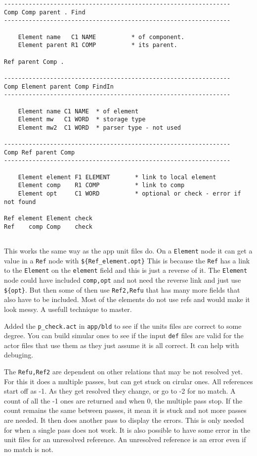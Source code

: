 \begin{verbatim}
----------------------------------------------------------------
Comp Comp parent . Find
----------------------------------------------------------------

    Element name   C1 NAME          * of component.
    Element parent R1 COMP          * its parent.

Ref parent Comp .

----------------------------------------------------------------
Comp Element parent Comp FindIn
----------------------------------------------------------------

    Element name C1 NAME  * of element
    Element mw   C1 WORD  * storage type
    Element mw2  C1 WORD  * parser type - not used
    
----------------------------------------------------------------
Comp Ref parent Comp
----------------------------------------------------------------

    Element element F1 ELEMENT       * link to local element
    Element comp    R1 COMP          * link to comp
    Element opt     C1 WORD          * optional or check - error if not found
    
Ref element Element check
Ref    comp Comp    check
    
\end{verbatim}

This works the same way as the app unit files do. On a \texttt{Element}
node it can get a value in a \texttt{Ref} node with
\texttt{\$\{Ref\_element.opt\}} This is because the \texttt{Ref} has a
link to the \texttt{Element} on the \texttt{element} field and this is
just a reverse of it. The \texttt{Element} node could have included
\texttt{comp,opt} and not need the reverse link and just use
\texttt{\$\{opt\}}. But then some of then use \texttt{Ref2,Refu} that
has many more fields that also have to be included. Most of the elements
do not use refs and would make it look messy. A usefull technique to
master.

Added the \texttt{p\_check.act} in \texttt{app/bld} to see if the units
files are correct to some degree. You can build simular ones to see if
the input \texttt{def} files are valid for the actor files that use them
as they just assume it is all correct. It can help with debuging.

The \texttt{Refu,Ref2} are dependent on other relations that may be not
resolved yet. For this it does a multiple passes, but can get stuck on
cirular ones. All references start off as -1. As they get resolved they
change, or go to -2 for no match. A count of all the -1 ones are
returned and when 0, the multiple pass stop. If the count remains the
same between passes, it mean it is stuck and not more passes are needed.
It then does another pass to display the errors. This is only needed for
when a single pass does not work. It is also possible to have some error
in the unit files for an unresolved reference. An unresolved reference
is an error even if no match is not.

